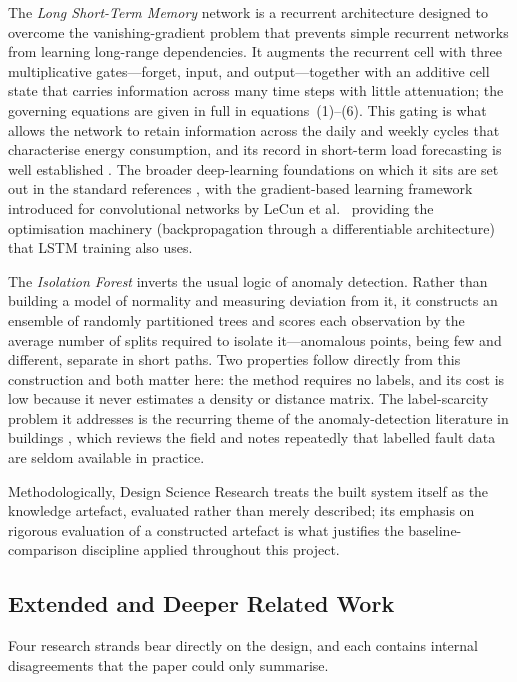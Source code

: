 \documentclass[11pt,a4paper]{article}
\begin{document}
The \emph{Long Short-Term Memory} network \cite{hochreiter1997long} is a
recurrent architecture designed to overcome the vanishing-gradient problem that
prevents simple recurrent networks from learning long-range dependencies. It
augments the recurrent cell with three multiplicative gates---forget, input, and
output---together with an additive cell state that carries information across
many time steps with little attenuation; the governing equations are given in full in equations~(1)--(6). This gating is what allows the network to retain
information across the daily and weekly cycles that characterise energy
consumption, and its record in short-term load forecasting is well established
\cite{kong2017short}. The broader deep-learning foundations on which it sits are
set out in the standard references \cite{lecun2015deep,goodfellow2016deep}, with
the gradient-based learning framework introduced for convolutional networks by
LeCun et al.\ \cite{lecun1998gradient} providing the optimisation machinery
(backpropagation through a differentiable architecture) that LSTM training also
uses.

The \emph{Isolation Forest} \cite{liu2008isolation} inverts the usual logic of
anomaly detection. Rather than building a model of normality and measuring
deviation from it, it constructs an ensemble of randomly partitioned trees and
scores each observation by the average number of splits required to isolate
it---anomalous points, being few and different, separate in short paths. Two
properties follow directly from this construction and both matter here: the
method requires no labels, and its cost is low because it never estimates a
density or distance matrix. The label-scarcity problem it addresses is the
recurring theme of the anomaly-detection literature in buildings
\cite{himeur2021artificial}, which reviews the field and notes repeatedly that
labelled fault data are seldom available in practice.

Methodologically, Design Science Research \cite{hevner2004design,peffers2007design}
treats the built system itself as the knowledge artefact, evaluated rather than
merely described; its emphasis on rigorous evaluation of a constructed artefact
is what justifies the baseline-comparison discipline applied throughout this
project.

\subsection{Extended and Deeper Related Work}
Four research strands bear directly on the design, and each contains internal
disagreements that the paper could only summarise.
\end{document}
